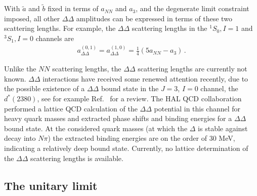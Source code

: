 \documentclass[nofootinbib, preprint, aps, prc, superscriptaddress,11pt]{revtex4-1}
\newcommand{\NN}{\ensuremath{N\!N}\xspace}
\newcommand{\oneS}{\ensuremath{{{}^{1}\!S_0}}\xspace}
\newcommand{\threeS}{\ensuremath{{{}^{3}\!S_1}}\xspace}
\newcommand{\1}{\mathbbm{1}}
\newcommand{\at}{\ensuremath{\tilde{a}}\xspace}
\newcommand{\bt}{\ensuremath{\tilde{b}}\xspace}
\newcommand{\aDDthreezero}{\ensuremath{a_3}\xspace}
\newcommand{\D}{\ensuremath{\Delta}\xspace}
\newcommand{\DD}{\ensuremath{\Delta\Delta}\xspace}
\begin{document}
With $\at$ and $\bt$ fixed in terms of $a_{\NN}$ and $\aDDthreezero$, and the degenerate limit constraint imposed, all other \DD amplitudes can be expressed in terms of these two scattering lengths. For example, the \DD scattering lengths in the $\oneS, I=1$ and $\threeS,I=0$ channels are
  \begin{align}
        a_{\DD}^{(0,1)} = a_{\DD}^{(1,0)} = \frac{1}{4} \left( 5 a_{\NN} - \aDDthreezero \right) \, .
    \end{align}


Unlike the \NN scattering lengths, the \DD scattering lengths are currently not known. 
\DD interactions have received some renewed attention recently, due to the possible existence of a \DD bound state in the $J=3$, $I=0$ channel, the $d^*(2380)$, see for example Ref.~\cite{Clement:2016vnl} for a review.
The HAL QCD collaboration \cite{Gongyo:2020pyy} performed a lattice QCD calculation of the \DD potential in this channel for heavy quark masses and extracted phase shifts and binding energies for a \DD bound state. At the considered quark masses (at which the \D is stable against decay into $N\pi$) the extracted binding energies are on the order of 30 MeV, indicating a relatively deep bound state.
Currently, no lattice determination of the \DD scattering lengths is available.



\subsection{The unitary limit}
\label{sec:unitary}
\end{document}
